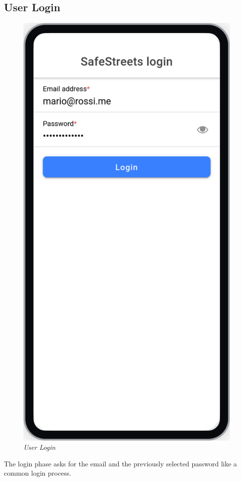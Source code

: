 \subsection{User Login}
\begin{figure}[H]
  \centering
  \includegraphics[origin=c,width=\textwidth,height=.70\textheight,keepaspectratio]{DD_Images/UserInterface/Login.jpg}
  \caption{\textit{User Login}}
\end{figure}

The login phase asks for the email and the previously selected password like a common login process.